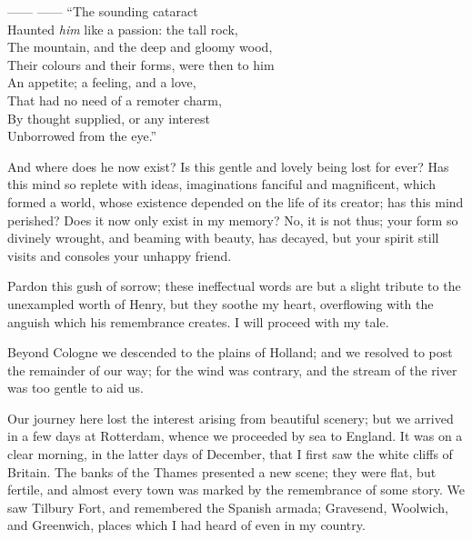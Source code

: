 \vspace*{1em}

{\noindent\small
\hspace*{2em}------ ------ ``The sounding cataract\\
\hspace*{2em}Haunted \emph{him} like a passion: the tall rock,\\
\hspace*{2em}The mountain, and the deep and gloomy wood,\\
\hspace*{2em}Their colours and their forms, were then to him\\
\hspace*{2em}An appetite; a feeling, and a love,\\
\hspace*{2em}That had no need of a remoter charm,\\
\hspace*{2em}By thought supplied, or any interest\\
\hspace*{2em}Unborrowed from the eye.''}

\vspace*{1em plus 1em}

And where does he now exist? Is
this gentle and lovely being lost for
ever? Has this mind so replete with
ideas, imaginations fanciful and magnificent,
which formed a world, whose
existence depended on the life of its
creator; has this mind perished? Does
it now only exist in my memory? No,
it is not thus; your form so divinely
wrought, and beaming with beauty,
has decayed, but your spirit still visits
and consoles your unhappy friend.

Pardon this gush of sorrow; these
ineffectual words are but a slight
tribute to the unexampled worth of Henry,
but they soothe my heart, overflowing
with the anguish which his remembrance
creates. I will proceed with
my tale.

Beyond Cologne we descended to the
plains of Holland; and we resolved to
post the remainder of our way; for the
wind was contrary, and the stream of
the river was too gentle to aid us.

Our journey here lost the interest
arising from beautiful scenery; but we
arrived in a few days at Rotterdam,
whence we proceeded by sea to England.
It was on a clear morning,
in the latter days of December, that I
first saw the white cliffs of Britain.
The banks of the Thames presented a
new scene; they were flat, but fertile,
and almost every town was marked by
the remembrance of some story. We
saw Tilbury Fort, and remembered the
Spanish armada; Gravesend, Woolwich,
and Greenwich, places which I had
heard of even in my country.

